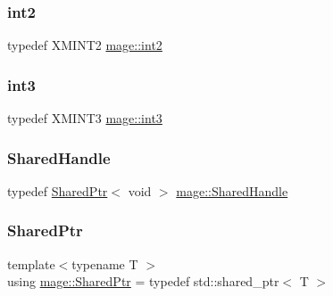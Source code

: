 \hypertarget{namespacemage_aa22600b49377872988582e782d7b1fcd}{}\label{namespacemage_aa22600b49377872988582e782d7b1fcd} 
\subsubsection{\texorpdfstring{int2}{int2}}
{\footnotesize\ttfamily typedef X\+M\+I\+N\+T2 \hyperlink{namespacemage_aa22600b49377872988582e782d7b1fcd}{mage\+::int2}}

\hypertarget{namespacemage_a80c7f9de83dfbbd55bbf339dbcbd99cc}{}\label{namespacemage_a80c7f9de83dfbbd55bbf339dbcbd99cc} 
\subsubsection{\texorpdfstring{int3}{int3}}
{\footnotesize\ttfamily typedef X\+M\+I\+N\+T3 \hyperlink{namespacemage_a80c7f9de83dfbbd55bbf339dbcbd99cc}{mage\+::int3}}

\hypertarget{namespacemage_ab892828913d6129acf71e0cec60467e5}{}\label{namespacemage_ab892828913d6129acf71e0cec60467e5} 
\subsubsection{\texorpdfstring{Shared\+Handle}{SharedHandle}}
{\footnotesize\ttfamily typedef \hyperlink{namespacemage_a1e01ae66713838a7a67d30e44c67703e}{Shared\+Ptr}$<$ void $>$ \hyperlink{namespacemage_ab892828913d6129acf71e0cec60467e5}{mage\+::\+Shared\+Handle}}

\hypertarget{namespacemage_a1e01ae66713838a7a67d30e44c67703e}{}\label{namespacemage_a1e01ae66713838a7a67d30e44c67703e} 
\subsubsection{\texorpdfstring{Shared\+Ptr}{SharedPtr}}
{\footnotesize\ttfamily template$<$typename T $>$ \\
using \hyperlink{namespacemage_a1e01ae66713838a7a67d30e44c67703e}{mage\+::\+Shared\+Ptr} = typedef std\+::shared\+\_\+ptr$<$ T $>$}

\hypertarget{namespacemage_a284e84e551a05d4fc6c957985b2de3ed}{}\label{namespacemage_a284e84e551a05d4fc6c957985b2de3ed} 
